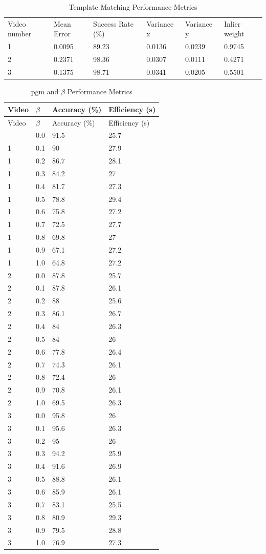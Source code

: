 \documentclass[12pt,a4paper]{article}
\begin{document}
\begin{table}[H]
\centering
\caption{Template Matching Performance Metrics}
\begin{tabular}{p{2cm} p{2cm} p{1.7cm} p{1.75cm} p{1.75cm} p{1.75cm}}
\toprule
Video number & Mean Error & Success Rate (\%) & Variance x & Variance y & Inlier weight \\
1 & 0.0095 & 89.23 & 0.0136 & 0.0239 & 0.9745 \\
2 & 0.2371 & 98.36 & 0.0307 & 0.0111 & 0.4271 \\
3 & 0.1375 & 98.71 & 0.0341 & 0.0205 & 0.5501 \\
\bottomrule
\end{tabular}
\end{table}
\newpage
\begin{longtable}{p{3cm} p{3cm} p{3cm} p{3cm}}
\caption{\acs{pgm} and $\beta$ Performance Metrics}
\label{tab:pgmBeta} \\
\toprule
Video & $\beta$ & Accuracy (\%) & Efficiency (s)\\
\midrule
\endfirsthead
\toprule
Video & $\beta$ & Accuracy (\%) & Efficiency (s)\\
\midrule
\endhead
\bottomrule
\endfoot
\bottomrule
\endlastfoot
1 & 0.0 & 91.5 & 25.7\\
1 & 0.1 & 90 & 27.9\\
1 & 0.2 & 86.7 & 28.1\\
1 & 0.3 & 84.2 & 27\\
1 & 0.4 & 81.7 & 27.3\\
1 & 0.5 & 78.8 & 29.4\\
1 & 0.6 & 75.8 & 27.2\\
1 & 0.7 & 72.5 & 27.7\\
1 & 0.8 & 69.8 & 27\\
1 & 0.9 & 67.1 & 27.2\\
1 & 1.0 & 64.8 & 27.2\\
2 & 0.0 & 87.8 & 25.7\\
2 & 0.1 & 87.8 & 26.1\\
2 & 0.2 & 88 & 25.6\\
2 & 0.3 & 86.1 & 26.7\\
2 & 0.4 & 84 & 26.3\\
2 & 0.5 & 84 & 26\\
2 & 0.6 & 77.8 & 26.4\\
2 & 0.7 & 74.3 & 26.1\\
2 & 0.8 & 72.4 & 26\\
2 & 0.9 & 70.8 & 26.1\\
2 & 1.0 & 69.5 & 26.3\\
3 & 0.0 & 95.8 & 26\\
3 & 0.1 & 95.6 & 26.3\\
3 & 0.2 & 95 & 26\\
3 & 0.3 & 94.2 & 25.9\\
3 & 0.4 & 91.6 & 26.9\\
3 & 0.5 & 88.8 & 26.1\\
3 & 0.6 & 85.9 & 26.1\\
3 & 0.7 & 83.1 & 25.5\\
3 & 0.8 & 80.9 & 29.3\\
3 & 0.9 & 79.5 & 28.8\\
3 & 1.0 & 76.9 & 27.3\\
\end{longtable}
\end{document}
